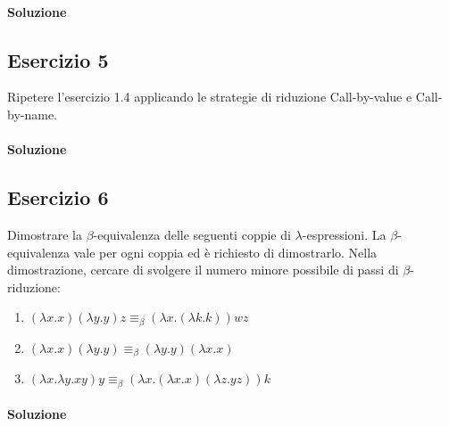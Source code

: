 \documentclass[12pt,a4paper]{article}
\begin{document}
\paragraph{Soluzione}

\subsection{Esercizio 5}
Ripetere l'esercizio 1.4 applicando le strategie di riduzione Call-by-value e Call-by-name.
\paragraph{Soluzione}

\subsection{Esercizio 6}
Dimostrare la $\beta$-equivalenza delle seguenti coppie di $\lambda$-espressioni. La $\beta$-equivalenza vale per ogni coppia ed è richiesto di dimostrarlo. Nella dimostrazione, cercare di svolgere il numero minore possibile di passi di $\beta$-riduzione:
\begin{enumerate}
    \item
    $(\lambda x.x)(\lambda y.y)z
    \equiv_\beta
    (\lambda x.(\lambda k.k))wz$

    \item
    $(\lambda x.x)(\lambda y.y)
    \equiv_\beta
    (\lambda y.y)(\lambda x.x)$

    \item
    $(\lambda x.\lambda y.xy)y
    \equiv_\beta
    (\lambda x.(\lambda x.x)(\lambda z.yz))k$
\end{enumerate}
\paragraph{Soluzione}
\end{document}
